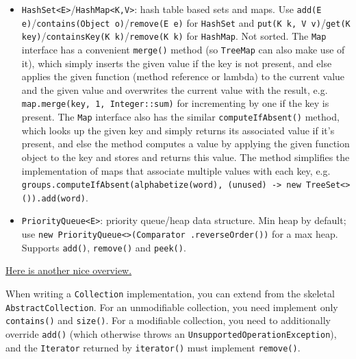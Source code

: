 \documentclass[table, xcdraw]{article}%
\begin{document}
\begin{itemize}
    \item \texttt{HashSet<E>}/\texttt{HashMap<K,V>}: hash table based sets and maps. Use \texttt{add(E e)}/\texttt{contains(Object o)}/\texttt{remove(E e)} for \texttt{HashSet} and \texttt{put(K k, V v)}/\texttt{get(K key)}/\texttt{containsKey(K k)}/\texttt{remove(K k)} for \texttt{HashMap}. Not sorted. The \texttt{Map} interface has a convenient \texttt{merge()} method (so \texttt{TreeMap} can also make use of it), which simply inserts the given value if the key is not present, and else applies the given function (method reference or lambda) to the current value and the given value and overwrites the current value with the result, e.g. \texttt{map.merge(key, 1, Integer::sum)} for incrementing by one if the key is present. The \texttt{Map} interface also has the similar \texttt{computeIfAbsent()} method, which looks up the given key and simply returns its associated value if it's present, and else the method computes a value by applying the given function object to the key and stores and returns this value. The method simplifies the implementation of maps that associate multiple values with each key, e.g. \texttt{groups.computeIfAbsent(alphabetize(word), (unused) -> new TreeSet<>()).add(word)}. 
    \item \texttt{PriorityQueue<E>}: priority queue/heap data structure. Min heap by default; use \texttt{new PriorityQueue<>(Comparator .reverseOrder())} for a max heap. Supports \texttt{add()}, \texttt{remove()} and \texttt{peek()}.
\end{itemize}

\href{https://quickref.me/java.html#java-collections-framework}{Here is another nice overview.}

When writing a \texttt{Collection} implementation, you can extend from the skeletal \texttt{AbstractCollection}. For an unmodifiable collection, you need implement only \texttt{contains()} and \texttt{size()}. For a modifiable collection, you need to additionally override \texttt{add()} (which otherwise throws an \texttt{UnsupportedOperationException}), and the \texttt{Iterator} returned by \texttt{iterator()} must implement \texttt{remove()}.
\end{document}
